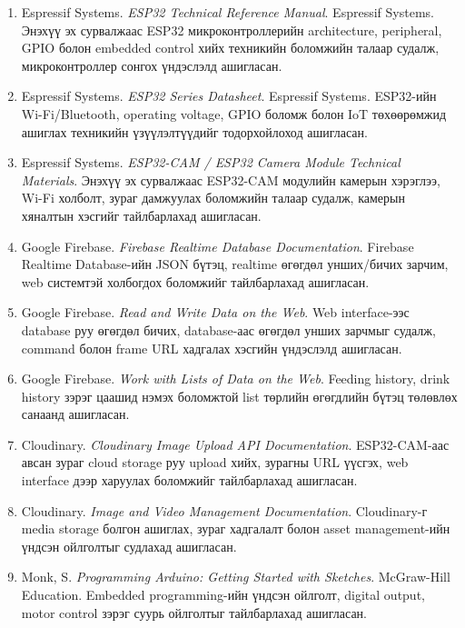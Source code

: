 \documentclass[12pt,a4paper]{report}
\begin{document}
\begin{enumerate}[leftmargin=1.2cm]
  \item Espressif Systems. \textit{ESP32 Technical Reference Manual}. Espressif Systems. Энэхүү эх сурвалжаас ESP32 микроконтроллерийн architecture, peripheral, GPIO болон embedded control хийх техникийн боломжийн талаар судалж, микроконтроллер сонгох үндэслэлд ашигласан.

  \item Espressif Systems. \textit{ESP32 Series Datasheet}. Espressif Systems. ESP32-ийн Wi-Fi/Bluetooth, operating voltage, GPIO боломж болон IoT төхөөрөмжид ашиглах техникийн үзүүлэлтүүдийг тодорхойлоход ашигласан.

  \item Espressif Systems. \textit{ESP32-CAM / ESP32 Camera Module Technical Materials}. Энэхүү эх сурвалжаас ESP32-CAM модулийн камерын хэрэглээ, Wi-Fi холболт, зураг дамжуулах боломжийн талаар судалж, камерын хяналтын хэсгийг тайлбарлахад ашигласан.

  \item Google Firebase. \textit{Firebase Realtime Database Documentation}. Firebase Realtime Database-ийн JSON бүтэц, realtime өгөгдөл унших/бичих зарчим, web системтэй холбогдох боломжийг тайлбарлахад ашигласан.

  \item Google Firebase. \textit{Read and Write Data on the Web}. Web interface-ээс database руу өгөгдөл бичих, database-аас өгөгдөл унших зарчмыг судалж, command болон frame URL хадгалах хэсгийн үндэслэлд ашигласан.

  \item Google Firebase. \textit{Work with Lists of Data on the Web}. Feeding history, drink history зэрэг цаашид нэмэх боломжтой list төрлийн өгөгдлийн бүтэц төлөвлөх санаанд ашигласан.

  \item Cloudinary. \textit{Cloudinary Image Upload API Documentation}. ESP32-CAM-аас авсан зураг cloud storage руу upload хийх, зурагны URL үүсгэх, web interface дээр харуулах боломжийг тайлбарлахад ашигласан.

  \item Cloudinary. \textit{Image and Video Management Documentation}. Cloudinary-г media storage болгон ашиглах, зураг хадгалалт болон asset management-ийн үндсэн ойлголтыг судлахад ашигласан.

  \item Monk, S. \textit{Programming Arduino: Getting Started with Sketches}. McGraw-Hill Education. Embedded programming-ийн үндсэн ойлголт, digital output, motor control зэрэг суурь ойлголтыг тайлбарлахад ашигласан.


\end{enumerate}
\end{document}
